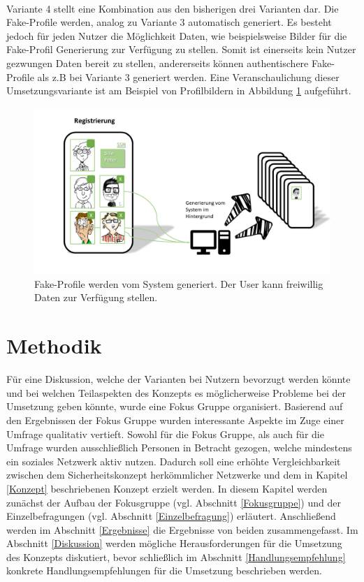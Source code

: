 \documentclass{sigchi}
\begin{document}
\\
Variante 4 stellt eine Kombination aus den bisherigen drei Varianten dar. Die Fake-Profile werden, analog zu Variante 3 automatisch generiert. Es besteht jedoch für jeden Nutzer die Möglichkeit Daten, wie beispielsweise Bilder für die Fake-Profil Generierung zur Verfügung zu stellen. Somit ist einerseits kein Nutzer gezwungen Daten bereit zu stellen, andererseits können authentischere Fake-Profile als z.B bei Variante 3 generiert werden. Eine Veranschaulichung dieser Umsetzungsvariante ist am Beispiel von Profilbildern in Abbildung \ref{fig:Umsetzung4} aufgeführt. 
\begin{figure}[htbp]
	\includegraphics[width=\columnwidth]{figures/Umsetzung4.PNG}
	\caption{Fake-Profile werden vom System generiert. Der User kann freiwillig Daten zur Verfügung stellen.}
	\label{fig:Umsetzung4}
\end{figure}
\section{Methodik}
Für eine Diskussion, welche der Varianten bei Nutzern bevorzugt werden könnte und bei welchen Teilaspekten des Konzepts es möglicherweise Probleme bei der Umsetzung geben könnte, wurde eine Fokus Gruppe organisiert. Basierend auf den Ergebnissen der Fokus Gruppe wurden interessante Aspekte im Zuge einer Umfrage qualitativ vertieft. Sowohl für die Fokus Gruppe, als auch für die Umfrage wurden ausschließlich Personen in Betracht gezogen, welche mindestens ein soziales Netzwerk aktiv nutzen. Dadurch soll eine erhöhte Vergleichbarkeit zwischen dem Sicherheitskonzept herkömmlicher Netzwerke und dem in Kapitel \ref{Konzept} beschriebenen Konzept erzielt werden. In diesem Kapitel werden zunächst der Aufbau der Fokusgruppe (vgl. Abschnitt \ref{Fokusgruppe}) und der Einzelbefragungen (vgl. Abschnitt \ref{Einzelbefragung}) erläutert. Anschließend werden im Abschnitt \ref{Ergebnisse} die Ergebnisse von beiden zusammengefasst. Im Abschnitt \ref{Diskussion} werden mögliche Herausforderungen für die Umsetzung des Konzepts diskutiert, bevor schließlich im Abschnitt \ref{Handlungsempfehlung} konkrete Handlungsempfehlungen für die Umsetzung beschrieben werden.
\end{document}
